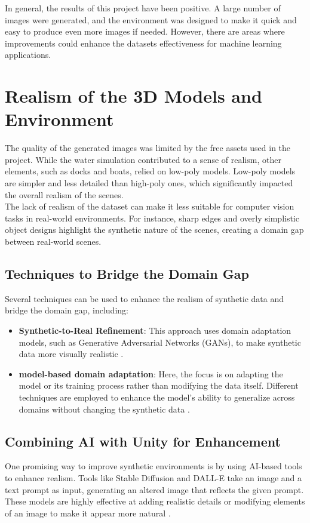 
In general, the results of this project have been positive. A large number of images were generated, and the environment was designed to make it quick and easy to produce even more images if needed. However, there are areas where improvements could enhance the datasets effectiveness for machine learning applications.

\section{Realism of the 3D Models and Environment}
The quality of the generated images was limited by the free assets used in the project. While the water simulation contributed to a sense of realism, other elements, such as docks and boats, relied on low-poly models. Low-poly models are simpler and less detailed than high-poly ones, which significantly impacted the overall realism of the scenes. \\

\noindent The lack of realism of the dataset can make it less suitable for computer vision tasks in real-world environments. For instance, sharp edges and overly simplistic object designs highlight the synthetic nature of the scenes, creating a domain gap between real-world scenes.

\subsection{Techniques to Bridge the Domain Gap}
Several techniques can be used to enhance the realism of synthetic data and bridge the domain gap, including:

\begin{itemize}
    \item \textbf{Synthetic-to-Real Refinement}: This approach uses domain adaptation models, such as Generative Adversarial Networks (GANs), to make synthetic data more visually realistic \cite{nikolenko2021synthetic}.

    \item \textbf{model-based domain adaptation}: Here, the focus is on adapting the model or its training process rather than modifying the data itself. Different techniques are employed to enhance the model's ability to generalize across domains without changing the synthetic data \cite{nikolenko2021synthetic}.
\end{itemize}


\subsection{Combining AI with Unity for Enhancement}
One promising way to improve synthetic environments is by using AI-based tools to enhance realism. Tools like Stable Diffusion and DALL-E take an image and a text prompt as input, generating an altered image that reflects the given prompt. These models are highly effective at adding realistic details or modifying elements of an image to make it appear more natural \cite{aiToExoand}. \\

